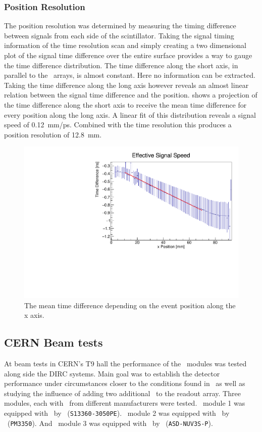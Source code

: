 \documentclass[../BTOF_summary.tex]{subfiles}
\begin{document}
\subsubsection*{Position Resolution}

The position resolution was determined by measuring the timing difference between signals from each side of the scintillator.
Taking the signal timing information of the time resolution scan and simply creating a two dimensional plot of the signal time difference over the entire surface provides a way to gauge the time difference distribution.
The time difference along the short axis, in parallel to the \sipm\ arrays, is almost constant.
Here no information can be extracted.
Taking the time difference along the long axis however reveals an almost linear relation between the signal time difference and the position.
\fig shows a projection of the time difference along the short axis to receive the mean time difference for every position along the long axis.
A linear fit of this distribution reveals a signal speed of \SI{0.12}{mm/ps}.
Combined with the time resolution this produces a position resolution of \SI{12.8}{mm}.

\begin{figure}[htbp]
    \centering
    \includegraphics[width=.7\textwidth]{fig/run51_EffectiveSpeed.pdf}
    \caption{The mean time difference depending on the event position along the x axis.}
    \label{fig:positionRes}
\end{figure}

\subsection{CERN Beam tests}
\label{sec:CernBeamTest}

At beam tests in CERN's T9 hall the performance of the \btof\ modules was tested along side the DIRC systems.
Main goal was to establish the detector performance under circumstances closer to the conditions found in \panda\ as well as  studying the influence of adding two additional \sipms\ to the readout array.
Three modules, each with \sipms\ from different manufacturers were tested.
\btof\ module 1 was equipped with \sipms\ by \hamamatsu~(\texttt{S13360-3050PE}).
\btof\ module 2 was equipped with \sipms\ by \ketek~(\texttt{PM3350}).
And \btof\ module 3 was equipped with \sipms\ by \advansid~(\texttt{ASD-NUV3S-P}).
\end{document}
